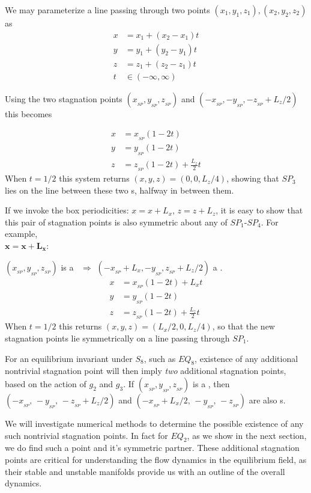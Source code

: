 \documentclass[letter,12pt,openany]{article}
\begin{document}
 \noindent We may parameterize a line passing through two points $(x_{1}, y_{1}, z_{1}),(x_{2}, y_{2}, z_{2})$
 as
 \begin{align}
  x &= x_{1} + (x_{2} - x_{1})t \\
  y &= y_{1} + (y_{2} - y_{1})t \\
  z &= z_{1} + (z_{2} - z_{1})t \\
  t &\in (-\infty,\infty)
 \end{align}
 
 Using the two stagnation points $(x_{_{SP}},y_{_{SP}},z_{_{SP}})$ and $(-x_{_{SP}},-y_{_{SP}},-z_{_{SP}} + L_z/2)$ this becomes
 
 \begin{align}
  x &= x_{_{SP}}(1-2t) \\
  y &= y_{_{SP}}(1-2t) \\
  z &= z_{_{SP}}(1-2t) + \frac{L_{z}}{2} t
 \end{align}
 When $t = 1/2$ this system returns $(x,y,z) = (0,0,L_{z}/4)$, showing
 that $SP_3$ lies on the line between these two \stagp s, halfway
 in between them.

 If we invoke the box periodicities: $x = x + L_{x}$, $z = z +
 L_{z}$, it is easy to show that this pair of stagnation points is also symmetric
 about any of $SP_1$-$SP_4$. For example, \\

 \noindent$\mathbf{x = x + L_{x}}$:

 \noindent $(x_{_{SP}},y_{_{SP}},z_{_{SP}})$ is a \stagp\ $\Rightarrow$
 $(-x_{_{SP}}+L_{x},-y_{_{SP}},z_{_{SP}}+L_{z}/2)$ a \stagp.
 \begin{align}
  x &= x_{_{SP}}(1-2t) + L_{x}t \\
  y &= y_{_{SP}}(1-2t) \\
  z &= z_{_{SP}}(1-2t) + \frac{L_{z}}{2} t
 \end{align}
 When $t = 1/2$ this returns $(x,y,z) = (L_{x}/2,0,L_{z}/4)$, so that the new stagnation
 points lie symmetrically on a line passing through $SP_1$. 

 For an equilibrium invariant under $S_8$, such as $EQ_8$, existence of any additional nontrivial stagnation point will then imply \textit{two} additional stagnation points, based on the action of $g_2$ and $g_3$.
 If $(x_{_{SP}},y_{_{SP}},z_{_{SP}})$ is a \stagp, then  $(-x_{_{SP}},\, -y_{_{SP}},\, -z_{_{SP}}+L_z/2)$ and $(-x_{_{SP}} + L_x/2,\, -y_{_{SP}},\, -z_{_{SP}})$ are also \stagp s. 

 We will investigate numerical methods to determine the possible existence of any such nontrivial stagnation points. In fact for $EQ_2$, as we show in the next section, we do find such a point and it's symmetric partner. These additional stagnation points are critical for understanding the flow dynamics in the equilibrium field, as their stable and unstable manifolds provide us with an outline of the overall dynamics.
 
\end{document}

